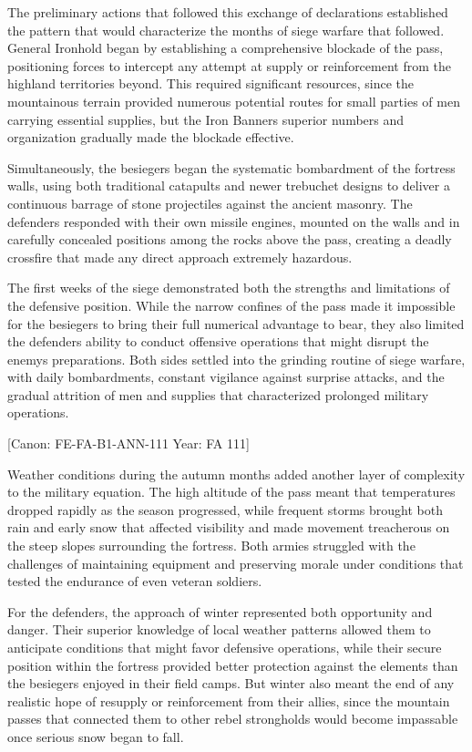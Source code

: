 The preliminary actions that followed this exchange of declarations
established the pattern that would characterize the months of siege
warfare that followed. General Ironhold began by establishing a
comprehensive blockade of the pass, positioning forces to intercept any
attempt at supply or reinforcement from the highland territories beyond.
This required significant resources, since the mountainous terrain
provided numerous potential routes for small parties of men carrying
essential supplies, but the Iron Banner\textquotesingle s superior
numbers and organization gradually made the blockade effective.

Simultaneously, the besiegers began the systematic bombardment of the
fortress walls, using both traditional catapults and newer trebuchet
designs to deliver a continuous barrage of stone projectiles against the
ancient masonry. The defenders responded with their own missile engines,
mounted on the walls and in carefully concealed positions among the
rocks above the pass, creating a deadly crossfire that made any direct
approach extremely hazardous.

The first weeks of the siege demonstrated both the strengths and
limitations of the defensive position. While the narrow confines of the
pass made it impossible for the besiegers to bring their full numerical
advantage to bear, they also limited the defenders\textquotesingle{}
ability to conduct offensive operations that might disrupt the
enemy\textquotesingle s preparations. Both sides settled into the
grinding routine of siege warfare, with daily bombardments, constant
vigilance against surprise attacks, and the gradual attrition of men and
supplies that characterized prolonged military operations.

{[}Canon: FE-FA-B1-ANN-111 \textbar{} Year: FA 111{]}

Weather conditions during the autumn months added another layer of
complexity to the military equation. The high altitude of the pass meant
that temperatures dropped rapidly as the season progressed, while
frequent storms brought both rain and early snow that affected
visibility and made movement treacherous on the steep slopes surrounding
the fortress. Both armies struggled with the challenges of maintaining
equipment and preserving morale under conditions that tested the
endurance of even veteran soldiers.

For the defenders, the approach of winter represented both opportunity
and danger. Their superior knowledge of local weather patterns allowed
them to anticipate conditions that might favor defensive operations,
while their secure position within the fortress provided better
protection against the elements than the besiegers enjoyed in their
field camps. But winter also meant the end of any realistic hope of
resupply or reinforcement from their allies, since the mountain passes
that connected them to other rebel strongholds would become impassable
once serious snow began to fall.

